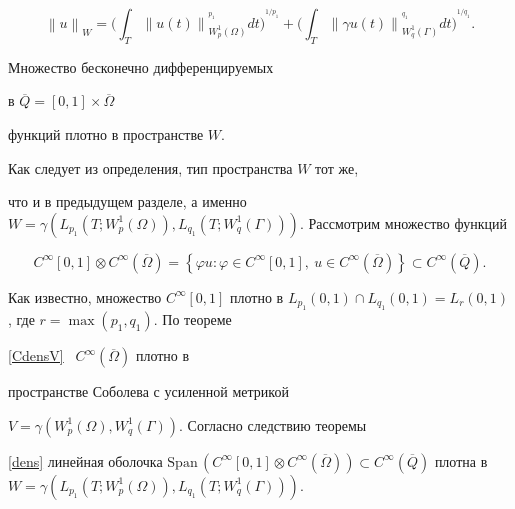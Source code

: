 $$


{\left\| {u} \right\|}_W = {\bigg( {\int_{T} {\left\| {u(t)} \right\|}_


{W_p^1(\Omega)}^{^{p_1}} dt} \bigg)}^{_{1/p_1}} +


{\bigg( {\int_{T} {\left\| {\gamma u(t)} \right\|}_


{W_q^1(\Gamma)}^{^{q_1}} dt} \bigg)}^{_{1/q_1}}.


$$





\begin{thms} \label{CdensW}


Множество бесконечно дифференцируемых 


в $\overline{Q}=[0,1] \times \overline{\Omega}$


функций плотно в пространстве $W$.


\end{thms}





\begin{pf}


Как следует из определения, тип пространства $W$ тот же,


что и в предыдущем разделе, а именно $W=\gamma (L_{p_1}(T;W_p^1(\Omega)),


L_{q_1}(T;W_q^1(\Gamma)))$. Рассмотрим множество функций


$$


C^\infty[0,1] \otimes C^\infty(\overline{\Omega})=\left\{ {\varphi u:


\varphi \in C^\infty[0,1],


\ u \in C^\infty(\overline{\Omega})}\right\}\subset C^\infty (\overline{Q}).


$$


Как известно, множество $C^\infty[0,1]$ плотно в $L_{p_1}(0,1)


\cap L_{q_1}(0,1)=L_r(0,1)$, где $r=\max (p_1,q_1).$ По теореме


\ref{CdensV} \ $C^\infty(\overline{\Omega})$ плотно в


пространстве Соболева с усиленной метрикой


$V=\gamma(W_p^1(\Omega), W_q^1(\Gamma))$. Согласно следствию теоремы


\ref{dens} линейная оболочка $\mathrm{Span}\,(C^\infty[0,1]


\otimes C^\infty(\overline{\Omega})) \subset C^\infty


(\overline{Q})$ плотна в $W = \gamma (L_{p_1}(T;W_p^1(\Omega)),


L_{q_1}(T;W_q^1(\Gamma)))$.


\end{pf}








